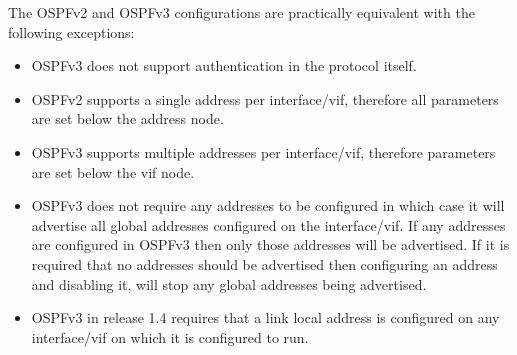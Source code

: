 \noindent
The OSPFv2 and OSPFv3 configurations are practically equivalent with
the following exceptions:
\begin{itemize}
\item OSPFv3 does not support authentication in the protocol itself.
\item OSPFv2 supports a single address per interface/vif, therefore all
parameters are set below the address node.
\item OSPFv3 supports multiple addresses per interface/vif, therefore
parameters are set below the vif node.
\item OSPFv3 does not require any addresses to be configured in which
case it will advertise all global addresses configured on the
interface/vif. If any addresses are configured in OSPFv3 then only
those addresses will be advertised. If it is required that no
addresses should be advertised then configuring an address and
disabling it, will stop any global addresses being advertised.
\item OSPFv3 in release 1.4 requires that a link local address is
configured on any interface/vif on which it is configured to run.
\end{itemize}

